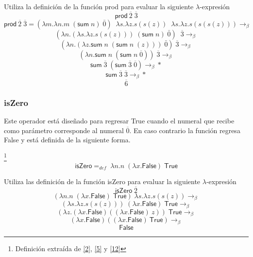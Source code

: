         \begin{exercise}
            Utiliza la definición de la función \textsf{prod} para evaluar la siguiente  $\lambda$-expresión
            \[
                    \textsf{prod}\  \overline{2} \; \overline{3} 
            \]
           \[
			 \textsf{prod}\  \overline{2} \; \overline{3}  = (\lambda m.\lambda n.m\; (\textsf{sum}\;n) \;  \bar{0}) \;\; \lambda s. \lambda z.s(s(z)) \;\; \lambda s. \lambda z.s(s(s(z))) \rightarrow_\beta
	     \]
	     \[
			(\lambda n. ( \lambda s. \lambda z.s(s(z)))\; (\textsf{sum} \; n) \;  \bar{0}) \;\;  \overline{3}   \rightarrow_\beta
	     \]
	     \[
			(\lambda n. (\lambda z.\textsf{sum} \; n \; (\textsf{sum} \; n \; (z))) \;  \bar{0}) \;  \overline{3}  \rightarrow_\beta
	     \]
	     \[
			(\lambda n.\textsf{sum} \; n \; (\textsf{sum} \; n \; \overline{0}))\; \overline{3}  \rightarrow_\beta
	     \]
	     \[
	       	\textsf{sum} \; \overline{3} \; (\textsf{sum} \; \overline{3} \; \overline{0})  \rightarrow_\beta*
              \]
	     \[
	       	\textsf{sum} \; \overline{3} \; \overline{3}  \rightarrow_\beta*
              \]
	    \[
		\overline{6}
	    \]


        \end{exercise}

        \subsubsection{isZero}
        	Este operador está diseñado para regresar \textsf{True} cuando el numeral que recibe como parámetro corresponde al numeral $\overline{0}$. En caso contrario la función regresa \textsf{False} y está definida de la siguiente forma.
        
	\begin{definition}\footnote{Definición extraída de \hyperlink{2}{[2]},  \hyperlink{5}{[5]} y \hyperlink{12}{[12]}}
            $$\textsf{isZero} =_{def}  \; \lambda n. n\;(\lambda x.\textsf{False}) \;\textsf{True}$$
        \end{definition}
        \begin{exercise}
            Utiliza las definición de la función \textsf{isZero} para evaluar la siguiente $\lambda$-expresión
            \[
                \textsf{isZero}  \; \overline{2}
            \]
            \[
                (\lambda n. n\;(\lambda x.\textsf{False})\;\textsf{True}) \; \lambda s.\lambda z.s(s(z)) \rightarrow_\beta 
            \]
		\[
			(\lambda s.\lambda z.s(s(z))) \; (\lambda x.\textsf{False}) \; \textsf{True}  \rightarrow_\beta 
		\]
		\[
			(\lambda z.(\lambda x.\textsf{False})((\lambda x.\textsf{False})\:z))\; \textsf{True}  \rightarrow_\beta 
		\]
		\[
			(\lambda x.\textsf{False}) ((\lambda x.\textsf{False})\:\textsf{True})  \rightarrow_\beta 
		\]
		\[
			 \textsf{False}
		\]
            

        \end{exercise}

